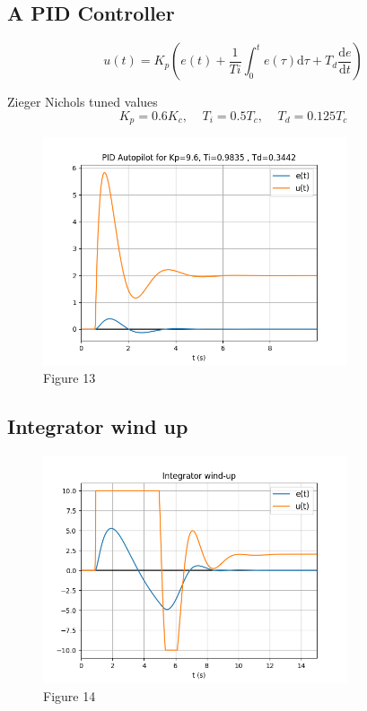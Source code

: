 \documentclass[8pt]{article}
\begin{document}
\subsection{A PID Controller}

\begin{equation}
    u(t) = K_p \left ( e(t) + \frac{1}{Ti}\int_{0}^{t}e(\tau)\mathrm{d}\tau + T_d\frac{\mathrm{d} e}{\mathrm{d} t} \right )
\end{equation}


Zieger Nichols tuned values
\begin{equation}
    K_p=0.6K_c, \;\;\;\; T_i=0.5T_c, \;\;\;\; T_d = 0.125T_c
\end{equation}

\begin{figure}[H]
    \centering
    \includegraphics[width=0.8\textwidth]{figures/FIGURE_13.png}
    \caption{Figure 13}
    \label{fig:figure13}
\end{figure}


\subsection{Integrator wind up}

\begin{figure}[H]
    \centering
    \includegraphics[width=0.8\textwidth]{figures/FIGURE_14.png}
    \caption{Figure 14}
    \label{fig:figure14}
\end{figure}
\end{document}
